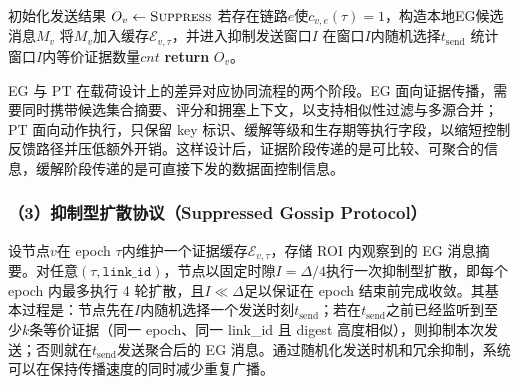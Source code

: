 \begin{algorithm}[H]
\caption{抑制型邻居扩散协同}
\label{alg:suppressed_gossip}
\BlankLine
{}
初始化发送结果 $O_v\leftarrow \textsc{Suppress}$\;
若存在链路$e$使$c_{v,e}(\tau)=1$，构造本地EG候选消息$M_v$\;
将$M_v$加入缓存$\mathcal{E}_{v,\tau}$，并进入抑制发送窗口$I$\;
在窗口$I$内随机选择$t_{\text{send}}$\;
\BlankLine
{}
统计窗口$I$内等价证据数量$cnt$\;
\BlankLine
{}
\textbf{return} $O_v$。
\end{algorithm}


EG 与 PT 在载荷设计上的差异对应协同流程的两个阶段。EG 面向证据传播，需要同时携带候选集合摘要、评分和拥塞上下文，以支持相似性过滤与多源合并；PT 面向动作执行，只保留 key 标识、缓解等级和生存期等执行字段，以缩短控制反馈路径并压低额外开销。这样设计后，证据阶段传递的是可比较、可聚合的信息，缓解阶段传递的是可直接下发的数据面控制信息。

\subsubsection*{（3）抑制型扩散协议（Suppressed Gossip Protocol）}

设节点$v$在 epoch $\tau$内维护一个证据缓存$\mathcal{E}_{v,\tau}$，存储 ROI 内观察到的 EG 消息摘要。对任意$(\tau,\texttt{link\_id})$，节点以固定时隙$I = \Delta/4$执行一次抑制型扩散，即每个 epoch 内最多执行 4 轮扩散，且$I \ll \Delta$足以保证在 epoch 结束前完成收敛。其基本过程是：节点先在$I$内随机选择一个发送时刻$t_{\text{send}}$；若在$t_{\text{send}}$之前已经监听到至少$k$条等价证据（同一 epoch、同一 link\_id 且 digest 高度相似），则抑制本次发送；否则就在$t_{\text{send}}$发送聚合后的 EG 消息。通过随机化发送时机和冗余抑制，系统可以在保持传播速度的同时减少重复广播。

